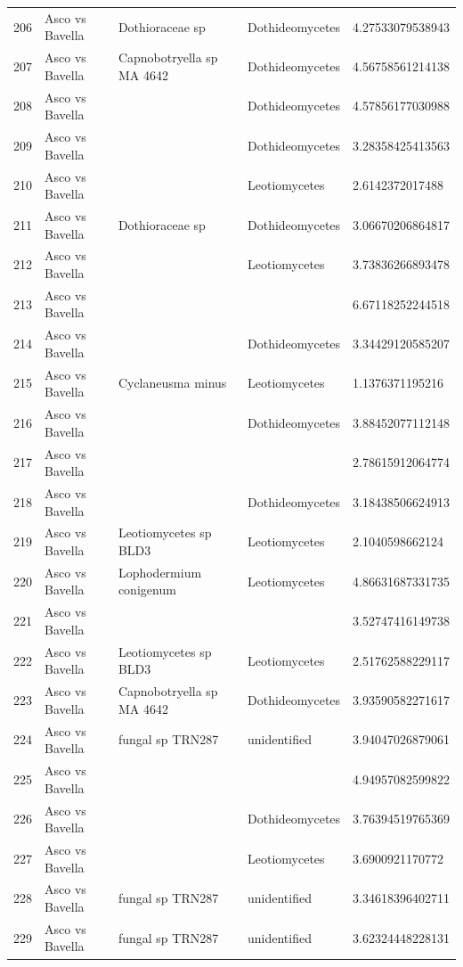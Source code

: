 \documentclass[12pt]{article}\usepackage[]{graphicx}\usepackage[]{color}
\numberwithin{figure}{section}
\begin{document}
\begin{table}[ht]
\begin{tabular}{lllll}
  206 & Asco vs Bavella & Dothioraceae sp & Dothideomycetes & 4.27533079538943 \\ 
  207 & Asco vs Bavella & Capnobotryella sp MA 4642 & Dothideomycetes & 4.56758561214138 \\ 
  208 & Asco vs Bavella &  & Dothideomycetes & 4.57856177030988 \\ 
  209 & Asco vs Bavella &  & Dothideomycetes & 3.28358425413563 \\ 
  210 & Asco vs Bavella &  & Leotiomycetes & 2.6142372017488 \\ 
  211 & Asco vs Bavella & Dothioraceae sp & Dothideomycetes & 3.06670206864817 \\ 
  212 & Asco vs Bavella &  & Leotiomycetes & 3.73836266893478 \\ 
  213 & Asco vs Bavella &  &  & 6.67118252244518 \\ 
  214 & Asco vs Bavella &  & Dothideomycetes & 3.34429120585207 \\ 
  215 & Asco vs Bavella & Cyclaneusma minus & Leotiomycetes & 1.1376371195216 \\ 
  216 & Asco vs Bavella &  & Dothideomycetes & 3.88452077112148 \\ 
  217 & Asco vs Bavella &  &  & 2.78615912064774 \\ 
  218 & Asco vs Bavella &  & Dothideomycetes & 3.18438506624913 \\ 
  219 & Asco vs Bavella & Leotiomycetes sp BLD3 & Leotiomycetes & 2.1040598662124 \\ 
  220 & Asco vs Bavella & Lophodermium conigenum & Leotiomycetes & 4.86631687331735 \\ 
  221 & Asco vs Bavella &  &  & 3.52747416149738 \\ 
  222 & Asco vs Bavella & Leotiomycetes sp BLD3 & Leotiomycetes & 2.51762588229117 \\ 
  223 & Asco vs Bavella & Capnobotryella sp MA 4642 & Dothideomycetes & 3.93590582271617 \\ 
  224 & Asco vs Bavella & fungal sp TRN287 & unidentified & 3.94047026879061 \\ 
  225 & Asco vs Bavella &  &  & 4.94957082599822 \\ 
  226 & Asco vs Bavella &  & Dothideomycetes & 3.76394519765369 \\ 
  227 & Asco vs Bavella &  & Leotiomycetes & 3.6900921170772 \\ 
  228 & Asco vs Bavella & fungal sp TRN287 & unidentified & 3.34618396402711 \\ 
  229 & Asco vs Bavella & fungal sp TRN287 & unidentified & 3.62324448228131 \\ 

\end{tabular}
\end{table}
\end{document}
